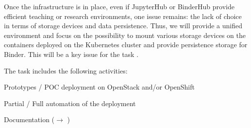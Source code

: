 \begin{task}[
  title=Easy deployment of JupyterHub and BinderHub on a variety of
  infrastructure,
  id=jh-bh-deplyment,
  lead=EP,
  PM=11PM, %
  wphases={0-18}, %
  partners={EP,UPSUD}]
  Once the infrastructure is in place, even if JupyterHub or BinderHub provide
  efficient teaching or research environments, one issue remains: the lack of
  choice in terms of storage devices and data persistence. Thus, we will provide
  a unified environment and  focus on the possibility to mount various  storage
  devices on the containers deployed on the Kubernetes cluster and provide
  persistence storage for Binder. This will be a key issue for the task
  .
  
  The task includes the following activities:
  \begin{compactitem}
  \item Prototypes / POC deployment on OpenStack and/or OpenShift
  \item Partial / Full automation of the deployment
  \item Documentation ($\rightarrow$
  )
  \end{compactitem}
\end{task}
